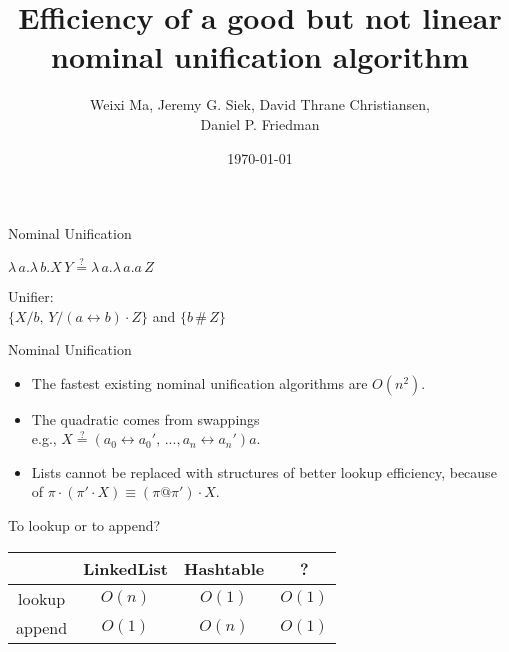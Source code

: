 \documentclass[pdf]{beamer}
\date{\today}
\title{Efficiency of a good but not linear nominal unification algorithm}
\author{Weixi Ma, Jeremy G. Siek, David Thrane Christiansen,\\ Daniel P. Friedman}
\newcommand{\bd}[2] {
 #1/ #2
}
\newcommand{\app}[2] {
#1\, #2
}
\newcommand{\swap}[2] {
  #1\leftrightarrow#2
}
\newcommand{\eqha}[2] {
  #1\stackrel{?}{=}#2
}
\begin{document}


\begin{frame}
  \maketitle
\end{frame}

\begin{frame}{Nominal Unification~\citep{urban_nominal_2004}}
  
  {\centering
    $\lambda\,a.\lambda\,b.\app{X}{Y} \stackrel{?}{=} \lambda\,a.\lambda\,a.\app{a}{Z}$
    \par}
  \vspace{1cm}
  {\centering
    Unifier:\\
    $\{\bd{X}{b},\,\bd{Y}{(\swap{a}{b})\cdot Z}\}$ and $\{b\,\#\,Z\}$
    \par}
\end{frame}

\begin{frame}{Nominal Unification~\citep{urban_nominal_2004}}

  {\centering
    \begin{itemize}
    \item The fastest existing nominal unification algorithms are $O(n^2)$.
    \item The quadratic comes from swappings \\
      e.g., $\eqha{X}{(\swap{a_0}{a_0'},\,...,\swap{a_n}{a_n'})a}$.
    \item Lists cannot be replaced with structures of better lookup efficiency,
      because of $\pi\cdot(\pi'\cdot X) \equiv (\pi@\pi')\cdot X$.
    \end{itemize}
   \par}
\end{frame}

\begin{frame}{To lookup or to append?}

  {\centering
    \begin{tabular}{|c|c|c|c|}
      \hline
      & LinkedList & Hashtable & ?\\
      \hline
      lookup & $O(n)$ & $O(1)$ & $O(1)$\\
      \hline
      append & $O(1)$ & $O(n)$ & $O(1)$\\
      \hline
    \end{tabular}
  \par}
\end{frame}
\end{document}

